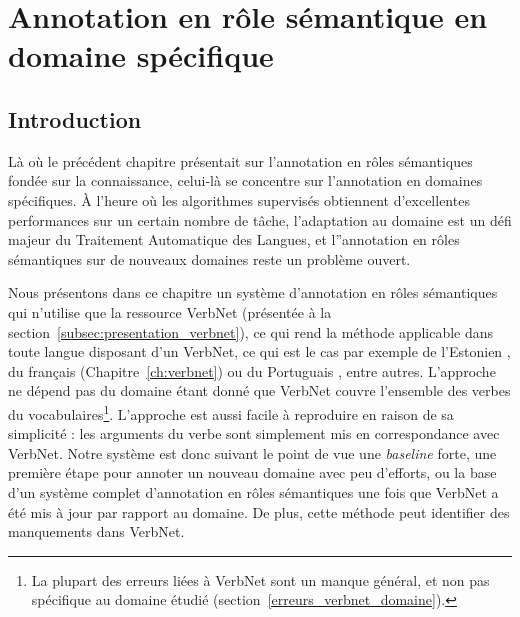 

\chapter{Annotation en rôle sémantique en domaine spécifique}
\label{ch:domainsrl}

\section{Introduction}

Là où le précédent chapitre présentait sur l'annotation en rôles sémantiques
fondée sur la connaissance, celui-là se concentre sur l'annotation en domaines
spécifiques. À l'heure où les algorithmes supervisés obtiennent d'excellentes
performances sur un certain nombre de tâche, l'adaptation au domaine est un
défi majeur du Traitement Automatique des Langues, et l''annotation en rôles
sémantiques sur de nouveaux domaines reste un problème ouvert. 

Nous présentons dans ce chapitre un système d'annotation en rôles sémantiques
qui n'utilise que la ressource VerbNet (présentée à la
section~\ref{subsec:presentation_verbnet}), ce qui rend la méthode applicable
dans toute langue disposant d'un VerbNet, ce qui est le cas par exemple de
l'Estonien \citep{jentson2014verbnet}, du français (Chapitre~\ref{ch:verbnet})
ou du Portuguais \citep{scarton2012towards}, entre autres. L'approche ne dépend
pas du domaine étant donné que VerbNet couvre l'ensemble des verbes du
vocabulaires\footnote{La plupart des erreurs liées à VerbNet sont un manque
général, et non pas spécifique au domaine étudié
(section~\ref{erreurs_verbnet_domaine}).}. L'approche est aussi facile à
reproduire en raison de sa simplicité : les arguments du verbe sont simplement
mis en correspondance avec VerbNet. Notre système est donc suivant le point de
vue une \emph{baseline} forte, une première étape pour annoter un nouveau
domaine avec peu d'efforts, ou la base d'un système complet d'annotation en
rôles sémantiques une fois que VerbNet a été mis à jour par rapport au domaine.
De plus, cette méthode peut identifier des manquements dans VerbNet.

